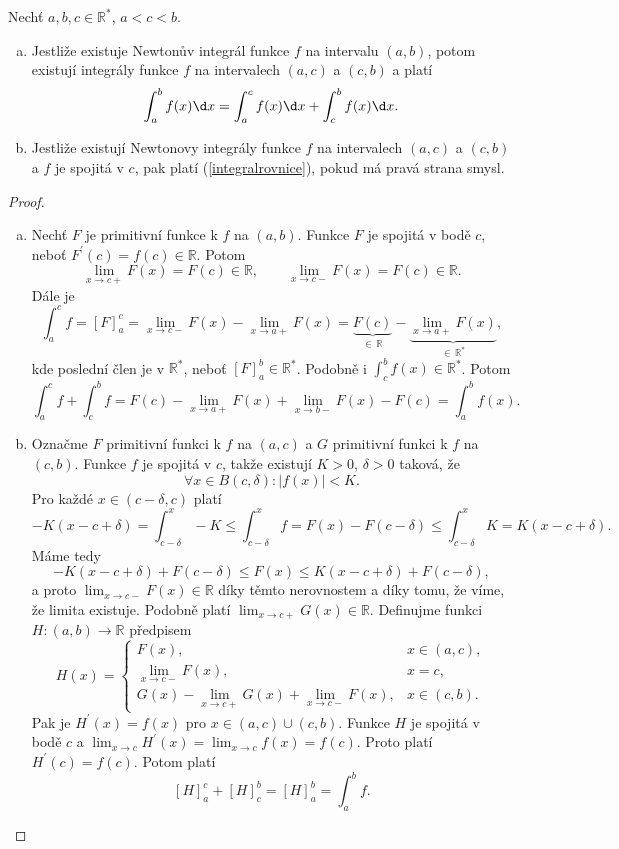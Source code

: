 \begin{veta}\label{veta8.28}
Nechť $a, b, c \in \mathbb{R}^*$, $a < c < b$.

\begin{enumerate}[(a)]
\item Jestliže existuje Newtonův integrál funkce $f$ na intervalu $(a, b)$, potom existují integrály funkce $f$ na intervalech $(a, c)$ a $(c, b)$ a platí
\begin{equation}\label{integralrovnice}
	\int_a^b f(x)\d x = \int_a^c f(x)\d x + \int_c^b f(x)\d x.
\end{equation}
\item Jestliže existují Newtonovy integrály funkce $f$ na intervalech $(a, c)$ a $(c, b)$ a $f$ je spojitá v $c$, pak platí (\ref{integralrovnice}), pokud má pravá strana smysl.
\end{enumerate}
\end{veta}

\begin{proof}\,
\begin{enumerate}[(a)]
	\item Nechť $F$ je primitivní funkce k $f$ na $(a,b)$.
	Funkce $F$ je spojitá v bodě $c$, neboť $F^\prime(c)=f(c)\in \mathbb R $.
	Potom
	$$
 \lim_{x\to c+} F(x) = F(c)\in \mathbb R, \qquad \lim_{x \to c-} F(x)=F(c) \in \mathbb R.
	$$
	Dále je
	$$
	    \int_a^c f = [F]_a^c = \lim_{x\to c-} F(x)-\lim_{x\to a+} F(x)=\underbrace{F(c)}_{\in \, \mathbb R} - \underbrace{\lim_{x \to a+} F(x)}_{\in \, \mathbb R ^*},
	$$
	kde poslední člen je v $\mathbb R ^*$, neboť $[F]_a^b \in \mathbb R ^*$. Podobně i
	$\int_c^b f(x) \in \mathbb R^*$. Potom
	$$
	    \int_a^c f + \int_c^b f = F(c) - \lim_{x\to a+} F(x) + \lim_{x\to b-} F(x) - F(c) = \int_a^b f(x).
	$$
	\item Označme $F$ primitivní funkci k $f$ na $(a,c)$ a $G$ primitivní funkci k $f$ na $(c,b)$.
	Funkce $f$ je spojitá v $c$, takže existují $K>0$, $\delta>0$ taková, že
	$$
	    \forall x \in B(c,\delta): |f(x)|<K.
	$$
	Pro každé $x \in (c-\delta, c)$ platí
	$$
	    -K(x-c+\delta)=\int_{c-\delta}^x -K\leq\int_{c-\delta}^x f= F(x)- F(c-\delta)\leq \int_{c-\delta}^x K = K(x-c+\delta).
	$$
	Máme tedy
	$$
	    -K(x-c+\delta) + F(c-\delta) \leq F(x) \leq K(x-c+\delta) + F(c-\delta),
	$$
	a proto $\lim_{x\to c-}F(x)\in \mathbb R $ díky těmto nerovnostem a díky tomu, že víme, že limita existuje.
	Podobně  platí $\lim_{x\to c+} G(x) \in \mathbb R $. Definujme funkci $H:(a,b)\to \mathbb R $
	předpisem
	$$
	    H(x)=\begin{cases}
				F(x), & x\in (a,c),\\
				\lim_{x\to c-} F(x), & x=c,\\
				G(x)-\lim_{x\to c+} G(x) + \lim_{x\to c-} F(x), & x\in (c,b).
			\end{cases}
	$$
	Pak je $H^\prime(x) = f(x)$ pro $x \in (a,c) \cup (c,b)$. Funkce $H$ je spojitá v bodě $c$
	a $\lim_{x\to c} H^\prime(x)=\lim_{x\to c} f(x)=f(c)$. Proto platí $H^\prime(c)=f(c)$.
	Potom platí
	$$
	    [H]_a^c + [H]_c^b = [H]_a^b= \int_a^b f.
	$$\qedhere
\end{enumerate}
\end{proof}


